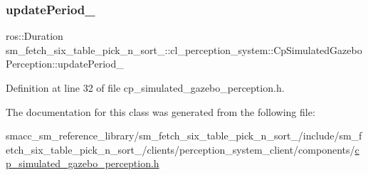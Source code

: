 \subsubsection{\texorpdfstring{update\+Period\+\_\+}{updatePeriod\_}}
{\footnotesize\ttfamily ros\+::\+Duration sm\+\_\+fetch\+\_\+six\+\_\+table\+\_\+pick\+\_\+n\+\_\+sort\+\_\+::cl\+\_\+perception\+\_\+system\+::\+Cp\+Simulated\+Gazebo\+Perception\+::update\+Period\+\_\+\hspace{0.3cm}{\ttfamily [private]}}



Definition at line 32 of file cp\+\_\+simulated\+\_\+gazebo\+\_\+perception.\+h.



The documentation for this class was generated from the following file\+:\begin{DoxyCompactItemize}
\item 
smacc\+\_\+sm\+\_\+reference\+\_\+library/sm\+\_\+fetch\+\_\+six\+\_\+table\+\_\+pick\+\_\+n\+\_\+sort\+\_/include/sm\+\_\+fetch\+\_\+six\+\_\+table\+\_\+pick\+\_\+n\+\_\+sort\+\_/clients/perception\+\_\+system\+\_\+client/components/\hyperlink{sm__fetch__six__table__pick__n__sort__1_2include_2sm__fetch__six__table__pick__n__sort__1_2clien03f67e02ecc6181787e7b5c2ec6798da}{cp\+\_\+simulated\+\_\+gazebo\+\_\+perception.\+h}\end{DoxyCompactItemize}
